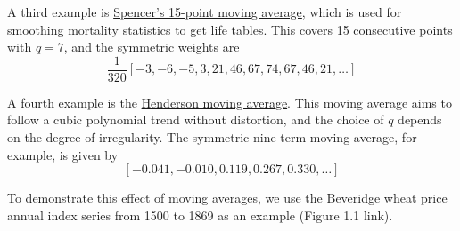 A third example is \underline{Spencer's 15-point moving average}, which is used for smoothing mortality statistics to get life tables. This covers 15 consecutive points with $q = 7$, and the symmetric weights are 
\[ \frac{1}{320} [ -3,-6,-5,3,21,46,67,74,67,46,21,\dots ] \]

A fourth example is the \underline{Henderson moving average}. This moving average aims to follow a cubic polynomial trend without distortion, and the choice of $q$ depends on the degree of irregularity. The symmetric nine-term moving average, for example, is given by
\[ [-0.041, -0.010, 0.119, 0.267, 0.330, \dots] \]

To demonstrate this effect of moving averages, we use the Beveridge wheat price annual index series from 1500 to 1869 as an example (Figure 1.1 link).
